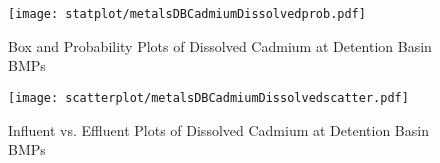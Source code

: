         \begin{figure}[hb]   %
            \centering
            \texttt{[image: statplot/metalsDBCadmiumDissolvedprob.pdf]}
            \caption{Box and Probability Plots of Dissolved Cadmium at Detention Basin BMPs}
        \end{figure}         %
        
        
        \begin{figure}[hb]   %
            \centering
            \texttt{[image: scatterplot/metalsDBCadmiumDissolvedscatter.pdf]}
            \caption{Influent vs. Effluent Plots of Dissolved Cadmium at Detention Basin BMPs}
        \end{figure}         %
        \clearpage
        